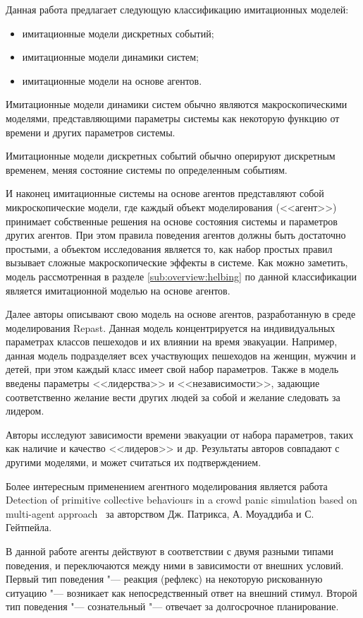 Данная работа предлагает следующую классификацию имитационных моделей:

\begin{itemize}
  \item имитационные модели дискретных событий;
  \item имитационные модели динамики систем;
  \item имитационные модели на основе агентов.
\end{itemize}

Имитационные модели динамики систем обычно являются макроскопическими моделями, представляющими параметры системы как некоторую функцию от времени и других параметров системы.

Имитационные модели дискретных событий обычно оперируют дискретным временем, меняя состояние системы по определенным событиям.

И наконец имитационные системы на основе агентов представляют собой микроскопические модели,
где каждый объект моделирования (<<агент>>) принимает собственные решения на основе состояния системы и параметров других агентов.
При этом правила поведения агентов должны быть достаточно простыми, а объектом исследования является то, как набор простых правил
вызывает сложные макроскопические эффекты в системе.
Как можно заметить, модель рассмотренная в разделе \ref{sub:overview:helbing} по данной классификации является имитационной моделью на основе агентов.

Далее авторы описывают свою модель на основе агентов, разработанную в среде моделирования Repast.
Данная модель концентрируется на индивидуальных параметрах классов пешеходов и их влиянии на время эвакуации.
Например, данная модель подразделяет всех участвующих пешеходов на женщин, мужчин и детей, при этом каждый класс имеет свой набор параметров.
Также в модель введены параметры <<лидерства>> и <<независимости>>, задающие соответственно желание вести других людей за собой и желание следовать за лидером.

Авторы исследуют зависимости времени эвакуации от набора параметров, таких как наличие и качество <<лидеров>> и др.
Результаты авторов совпадают с другими моделями, и может считаться их подтверждением.

Более интересным применением агентного моделирования является работа Detection of primitive collective behaviours in a crowd panic simulation based on multi-agent approach~\cite{patrix2012detection} за авторством Дж. Патрикса, А. Моуаддиба и С. Гейтпейла.

В данной работе агенты действуют в соответствии с двумя разными типами поведения, и переключаются между ними в зависимости от внешних условий.
Первый тип поведения "--- реакция (рефлекс) на некоторую рискованную ситуацию "--- возникает как непосредственный ответ на внешний стимул.
Второй тип поведения "--- сознательный "--- отвечает за долгосрочное планирование.

